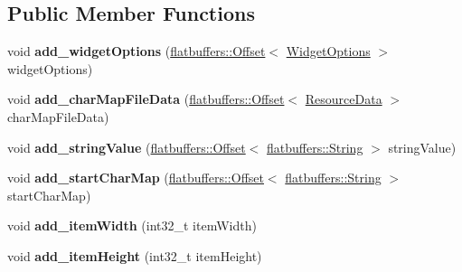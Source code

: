 \subsection*{Public Member Functions}
\begin{DoxyCompactItemize}
\item 
\mbox{\label{structflatbuffers_1_1TextAtlasOptionsBuilder_ac82a420a889e14aadc300faf23958bc5}} 
void {\bfseries add\+\_\+widget\+Options} (\hyperlink{structflatbuffers_1_1Offset}{flatbuffers\+::\+Offset}$<$ \hyperlink{structflatbuffers_1_1WidgetOptions}{Widget\+Options} $>$ widget\+Options)
\item 
\mbox{\label{structflatbuffers_1_1TextAtlasOptionsBuilder_add765949684ca48e1935701ae56d76b1}} 
void {\bfseries add\+\_\+char\+Map\+File\+Data} (\hyperlink{structflatbuffers_1_1Offset}{flatbuffers\+::\+Offset}$<$ \hyperlink{structflatbuffers_1_1ResourceData}{Resource\+Data} $>$ char\+Map\+File\+Data)
\item 
\mbox{\label{structflatbuffers_1_1TextAtlasOptionsBuilder_afbe98e2c3e3dc9c252dcf56a558ff8c3}} 
void {\bfseries add\+\_\+string\+Value} (\hyperlink{structflatbuffers_1_1Offset}{flatbuffers\+::\+Offset}$<$ \hyperlink{structflatbuffers_1_1String}{flatbuffers\+::\+String} $>$ string\+Value)
\item 
\mbox{\label{structflatbuffers_1_1TextAtlasOptionsBuilder_af905ec4ac38b1ede2ab293588a649dba}} 
void {\bfseries add\+\_\+start\+Char\+Map} (\hyperlink{structflatbuffers_1_1Offset}{flatbuffers\+::\+Offset}$<$ \hyperlink{structflatbuffers_1_1String}{flatbuffers\+::\+String} $>$ start\+Char\+Map)
\item 
\mbox{\label{structflatbuffers_1_1TextAtlasOptionsBuilder_a5c22c172e10c92f8d6ad0facca010a95}} 
void {\bfseries add\+\_\+item\+Width} (int32\+\_\+t item\+Width)
\item 
\mbox{\label{structflatbuffers_1_1TextAtlasOptionsBuilder_afecfd1739357b0ed3c60208bfc615281}} 
void {\bfseries add\+\_\+item\+Height} (int32\+\_\+t item\+Height)
\item 

\end{DoxyCompactItemize}
